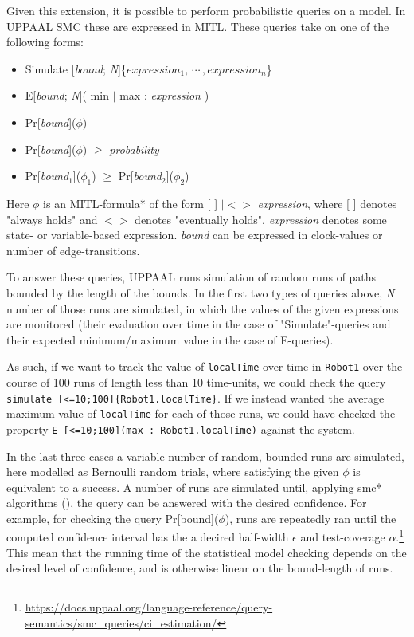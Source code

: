 Given this extension, it is possible to perform probabilistic queries on a model. In UPPAAL SMC these are expressed in MITL. These queries take on one of the following forms:

\begin{itemize}
    \item Simulate [\textit{bound}; \textit{N}]\{$expression_1,\, \dotsm \, , expression_n$\}
    \item E[\textit{bound}; \textit{N}]( min $|$ max :  \textit{expression} )
    \item Pr[\textit{bound}]($\phi$)
    \item Pr[\textit{bound}]($\phi$) $\geq$ \textit{probability}
    \item Pr[\textit{bound}$_1$]($\phi_1$) $\geq$ Pr[\textit{bound}$_2$]($\phi_2$)
    
\end{itemize}

Here $\phi$ is an MITL-formula* of the form [ ] $|<>$ \textit{expression}, where [ ] denotes "always holds" and $<>$ denotes "eventually holds".
\textit{expression} denotes some state- or variable-based expression. \textit{bound} can be expressed in clock-values or number of edge-transitions.

To answer these queries, UPPAAL runs simulation of random runs of paths bounded by the length of the bounds. In the first two types of queries above, \textit{N} number of those runs are simulated, in which the values of the given expressions are monitored (their evaluation over time in the case of "Simulate"-queries and their expected minimum/maximum value in the case of E-queries). 

As such, if we want to track the value of \verb|localTime| over time in \verb|Robot1| over the course of 100 runs of length less than 10 time-units, we could check the query \verb|simulate [<=10;100]{Robot1.localTime}|. If we instead wanted the average maximum-value of \verb|localTime| for each of those runs, we could have checked the property \verb|E [<=10;100](max : Robot1.localTime)| against the system. 

In the last three cases a variable number of random, bounded runs are simulated, here modelled as Bernoulli random trials, where satisfying the given $\phi$ is equivalent to a success. A number of runs are simulated until, applying smc* algorithms (\cite[see:][]{UPPAALSMC}), the query can be answered with the desired confidence. For example, for checking the query Pr[bound]($\phi$), runs are repeatedly ran until the computed confidence interval has the a decired half-width $\epsilon$ and 
test-coverage $\alpha$.\footnote{\url{https://docs.uppaal.org/language-reference/query-semantics/smc_queries/ci_estimation/}} This mean that the running time of the statistical model checking depends on the desired level of confidence, and is otherwise linear on the bound-length of runs.

